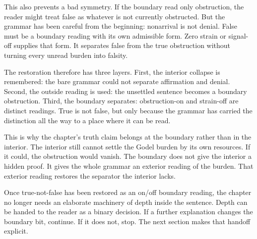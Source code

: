 This also prevents a bad symmetry. If the boundary read only obstruction,
the reader might treat false as whatever is not currently obstructed. But
the grammar has been careful from the beginning: nonarrival is not denial.
False must be a boundary reading with its own admissible form. Zero strain
or signal-off supplies that form. It separates false from the true
obstruction without turning every unread burden into falsity.

The restoration therefore has three layers. First, the interior collapse is
remembered: the bare grammar could not separate affirmation and denial.
Second, the outside reading is used: the unsettled sentence becomes a
boundary obstruction. Third, the boundary separates: obstruction-on and
strain-off are distinct readings. True is not false, but only because the
grammar has carried the distinction all the way to a place where it can be
read.

This is why the chapter's truth claim belongs at the boundary rather than in
the interior. The interior still cannot settle the Godel burden by its own
resources. If it could, the obstruction would vanish. The boundary does not
give the interior a hidden proof. It gives the whole grammar an exterior
reading of the burden. That exterior reading restores the separator the
interior lacks.

Once true-not-false has been restored as an on/off boundary reading, the
chapter no longer needs an elaborate machinery of depth inside the sentence.
Depth can be handed to the reader as a binary decision. If a further
explanation changes the boundary bit, continue. If it does not, stop. The
next section makes that handoff explicit.
